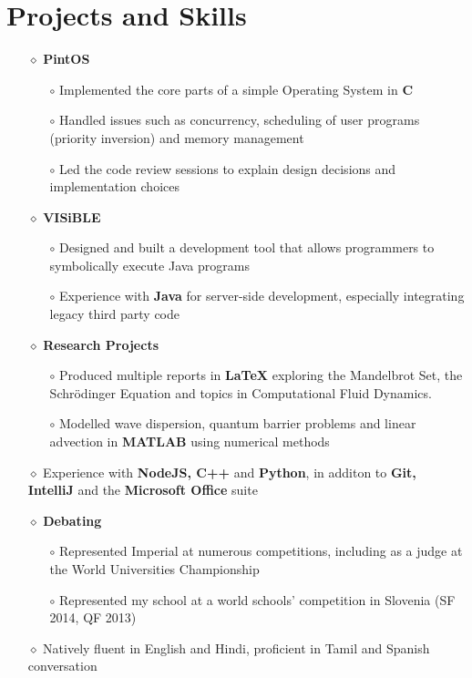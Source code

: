 \documentclass[a4paper]{article}
\begin{document}
\vspace{-10pt}
\section*{Projects and Skills}
\vspace{-7pt}

\begin{itemize}

\item[$\diamond$] \textbf{PintOS}
\begin{itemize}
\item[$\circ$] Implemented the core parts of a simple Operating System in \textbf{C}
\item[$\circ$] Handled issues such as concurrency, scheduling of user programs (priority inversion) and memory management
\item[$\circ$] Led the code review sessions to explain design decisions and implementation choices
\end{itemize}

\item[$\diamond$] \textbf{VISiBLE}
\begin{itemize}
\item[$\circ$] Designed and built a development tool that allows programmers to symbolically execute Java programs
\item[$\circ$] Experience with \textbf{Java} for server-side development, especially integrating legacy third party code
\end{itemize}

\item[$\diamond$] \textbf{Research Projects}
\begin{itemize}
\item[$\circ$] Produced multiple reports in \textbf{\LaTeX} exploring the Mandelbrot Set, the Schr\"odinger Equation and topics in Computational Fluid Dynamics.
\item[$\circ$] Modelled wave dispersion, quantum barrier problems and linear advection in \textbf{MATLAB} using numerical methods
\end{itemize}

\item[$\diamond$] Experience with \textbf{NodeJS, C++} and \textbf{Python}, in additon to \textbf{Git, IntelliJ} and the \textbf{Microsoft Office} suite

\item[$\diamond$] \textbf{Debating}
\begin{itemize}
\item[$\circ$] Represented Imperial at numerous competitions, including as a judge at the World Universities Championship
\item[$\circ$] Represented my school at a world schools' competition in Slovenia (SF 2014, QF 2013)
\end{itemize}

\item[$\diamond$] Natively fluent in English and Hindi, proficient in Tamil and Spanish conversation

\end{itemize}
\end{document}
